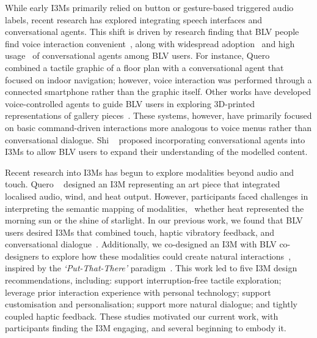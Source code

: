 While early I3Ms primarily relied on button or gesture-based triggered audio labels, recent research has explored integrating speech interfaces and conversational agents. This shift is driven by research finding that BLV people find voice interaction convenient~\cite{Azenkot2013}, along with widespread adoption~\cite{Pradhan2018} and high usage~\cite{Abdolrahmani2018} of conversational agents among BLV users. For instance, Quero \etal~\cite{Quero2019} combined a tactile graphic of a floor plan with a conversational agent that focused on indoor navigation; however, voice interaction was performed through a connected smartphone rather than the graphic itself. Other works have developed voice-controlled agents to guide BLV users in exploring 3D-printed representations of gallery pieces~\cite{Bartolome2019,Quero2018}. These systems, however, have primarily focused on basic command-driven interactions more analogous to voice menus rather than conversational dialogue. Shi \etal~\cite{Shi2017b,Shi2019} proposed incorporating conversational agents into I3Ms to allow BLV users to expand their understanding of the modelled content.

Recent research into I3Ms has begun to explore modalities beyond audio and touch. Quero \etal~\cite{Quero2018} designed an I3M representing an art piece that integrated localised audio, wind, and heat output. However, participants faced challenges in interpreting the semantic mapping of modalities, \eg\, whether heat represented the morning sun or the shine of starlight. In our previous work, we found that BLV users desired I3Ms that combined touch, haptic vibratory feedback, and conversational dialogue~\cite{Reinders2020}. Additionally, we co-designed an I3M with BLV co-designers to explore how these modalities could create natural interactions~\cite{Reinders2023}, inspired by the \textit{`Put-That-There'} paradigm~\cite{Bolt1980}. This work led to five I3M design recommendations, including: support interruption-free tactile exploration; leverage prior interaction experience with personal technology; support customisation and personalisation; support more natural dialogue; and tightly coupled haptic feedback. These studies motivated our current work, with participants finding the I3M engaging, and several beginning to embody it.

